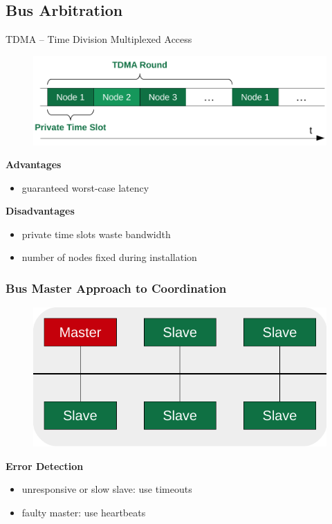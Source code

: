 \documentclass{beamer}
\newcommand{\paragraph}[1]{\vspace{6pt}\textbf{#1}}
\begin{document}
\subsection{Bus Arbitration}

\begin{frame}{TDMA -- Time Division Multiplexed Access}
  \begin{figure}[H]
    \includegraphics[width=.85\textwidth]{images/tdma.pdf}
  \end{figure}
  
  \paragraph{Advantages}
  \begin{itemize}
    \item guaranteed worst-case latency
  \end{itemize}
  
  \paragraph{Disadvantages}
  \begin{itemize}
    \item private time slots waste bandwidth
    \item number of nodes fixed during installation
  \end{itemize}
\end{frame}

\begin{frame}
  \frametitle{Bus Master Approach to Coordination}
  
  \begin{figure}[H]
    \includegraphics[width=.7\textwidth]{images/bus-master.pdf}
  \end{figure}
  
  \paragraph{Error Detection}
  \begin{itemize}
    \item unresponsive or slow slave: use timeouts
    \item faulty master: use heartbeats
  \end{itemize}
\end{frame}
\end{document}
